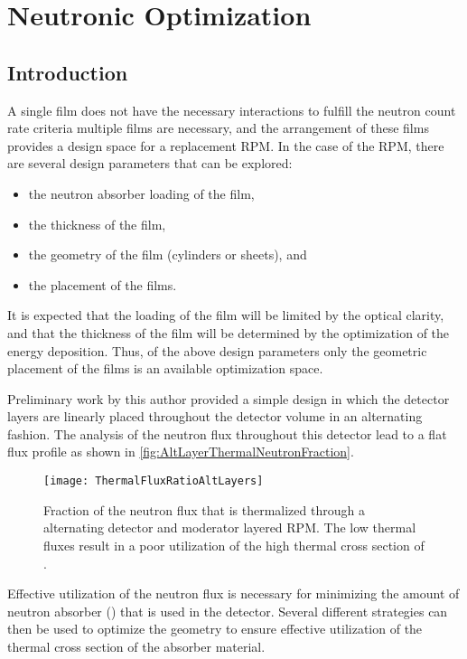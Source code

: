 \chapter{Neutronic Optimization}
\label{chap:GARPMOpt}
\section{Introduction}
A single film does not have the necessary interactions to fulfill the neutron count rate criteria multiple films are necessary, and the arrangement of these films provides a design space for a replacement RPM.
In the case of the RPM, there are several design parameters that can be explored:
\begin{itemize}
  \item the neutron absorber loading of the film,
  \item the thickness of the film,
  \item the geometry of the film (cylinders or sheets), and
  \item the placement of the films.
\end{itemize}
It is expected that the loading of the film will be limited by the optical clarity, and that the thickness of the film will be determined by the optimization of the energy deposition.
Thus, of the above design parameters only the geometric placement of the films is an available optimization space.

Preliminary work by this author provided a simple design in which the detector layers are linearly placed throughout the detector volume in an alternating fashion.
The analysis of the neutron flux throughout this detector lead to a flat flux profile as shown in \autoref{fig:AltLayerThermalNeutronFraction}.
\begin{figure}
  \texttt{[image: ThermalFluxRatioAltLayers]}
	\caption{Fraction of the neutron flux that is thermalized through a alternating detector and moderator layered RPM.  The low thermal fluxes result in a poor utilization of the high thermal cross section of .}
	\label{fig:AltLayerThermalNeutronFraction}
\end{figure}
Effective utilization of the neutron flux is necessary for minimizing the amount of neutron absorber () that is used in the detector.
Several different strategies can then be used to optimize the geometry to ensure effective utilization of the thermal cross section of the absorber material.

